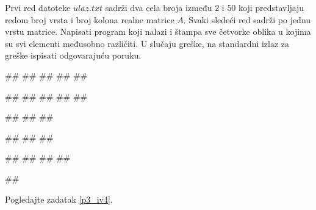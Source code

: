 \begin{Exercise}[label=p3_x6]         
Prvi red datoteke $ulaz.txt$ sadrži dva cela broja između $2$ i $50$
koji predstavljaju redom broj vrsta i broj kolona realne matrice
$A$. Svaki sledeći red sadrži po jednu vrstu matrice. Napisati
program koji nalazi i štampa sve četvorke oblika
 u kojima su svi
elementi međusobno različiti.
U slučaju greške, na standardni izlaz za greške ispisati odgovarajuću poruku.

\begin{minitest}
\begin{upotreba}{1}
##
##
##
##
##

#\naslovIzlaz#
##
##
##
##
\end{upotreba}
\end{minitest}
\begin{minitest}
\begin{upotreba}{2}
##
##
##

#\naslovIzlazZaGresku#
##
##
\end{upotreba}
\end{minitest}
\begin{minitest}
\begin{upotreba}{3}
##
##
##
##

#\naslovIzlaz#
\end{upotreba}
\end{minitest}
\end{Exercise}
\begin{Answer}[ref=p3_x6]

Pogledajte zadatak \ref{p3_iv4}.
\end{Answer}





